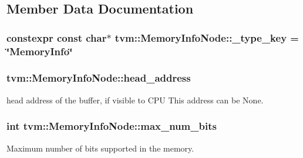 \subsection{Member Data Documentation}
\subsubsection[{\texorpdfstring{\+\_\+type\+\_\+key}{_type_key}}]{\setlength{\rightskip}{0pt plus 5cm}constexpr const char$\ast$ tvm\+::\+Memory\+Info\+Node\+::\+\_\+type\+\_\+key = \char`\"{}Memory\+Info\char`\"{}\hspace{0.3cm}{\ttfamily [static]}}\hypertarget{classtvm_1_1MemoryInfoNode_a679e07b35ff1da70063e3146e7cbb9dd}{}\label{classtvm_1_1MemoryInfoNode_a679e07b35ff1da70063e3146e7cbb9dd}
\subsubsection[{\texorpdfstring{head\+\_\+address}{head_address}}]{ tvm\+::\+Memory\+Info\+Node\+::head\+\_\+address}\hypertarget{classtvm_1_1MemoryInfoNode_af2e6ca44c6258c7c743482ae6f7c7deb}{}\label{classtvm_1_1MemoryInfoNode_af2e6ca44c6258c7c743482ae6f7c7deb}


head address of the buffer, if visible to C\+PU This address can be None. 

\subsubsection[{\texorpdfstring{max\+\_\+num\+\_\+bits}{max_num_bits}}]{\setlength{\rightskip}{0pt plus 5cm}int tvm\+::\+Memory\+Info\+Node\+::max\+\_\+num\+\_\+bits}\hypertarget{classtvm_1_1MemoryInfoNode_ae0b6f9572f77177a08a8a522d1ec2aa4}{}\label{classtvm_1_1MemoryInfoNode_ae0b6f9572f77177a08a8a522d1ec2aa4}


Maximum number of bits supported in the memory. 

